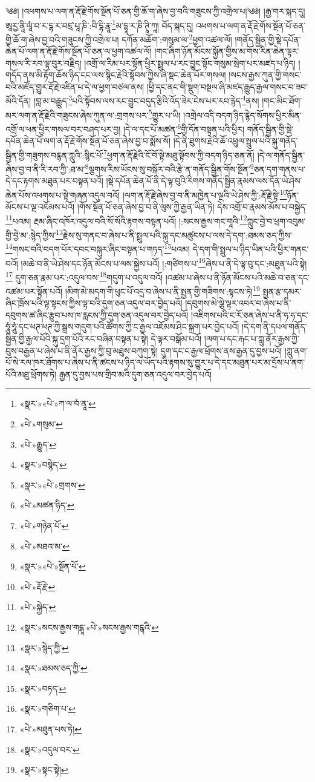 ༄༅། །འཕགས་པ་ལག་ན་རྡོ་རྗེ་གོས་སྔོན་པོ་ཅན་གྱི་ཆོ་ག་ཞེས་བྱ་བའི་གཟུངས་ཀྱི་འགྲེལ་པ།༄༅། །རྒྱ་གར་སྐད་དུ། ཨཱརྱ་ནཱི་ལཱཾ་བ་ར་དྷ་ར་བཛྲ་པཱ་ཎི་:བི་དྷི་རྣཱ་\footnote{«སྣར་»«པེ་»ཀ་ལ་བཾ་ནཱ་}མ་དྷཱ་ར་ཎི་ཊཱི་ཀཱ། བོད་སྐད་དུ། འཕགས་པ་ལག་ན་རྡོ་རྗེ་གོས་སྔོན་པོ་ཅན་གྱི་ཆོ་ག་ཞེས་བྱ་བའི་གཟུངས་ཀྱི་འགྲེལ་པ། དཀོན་མཆོག་:གསུམ་ལ་\footnote{«པེ་»གསུམ་}ཕྱག་འཚལ་ལོ། །གནོད་སྦྱིན་གྱི་སྡེ་དཔོན་ཆེན་པོ་ལག་ན་རྡོ་རྗེ་གོས་སྔོན་པོ་ཅན་ལ་ཕྱག་འཚལ་ལོ། །གང་ཞིག་ཉོན་མོངས་སྐྱོན་གྱིས་མ་གོས་རིན་ཆེན་ལྟར་གསལ་རི་རབ་ལྟ་བུར་བརྗིད། །འགྲོ་ལ་རིམ་པར་སྟོན་ཕྱིར་སྤྲུལ་པ་རང་བྱུང་སྟོང་གསུམ་སྲེག་པར་མཛད་པ་ཉིད། །གདོད་ནས་མི་རྟོག་ཆོས་ཉིད་ངང་ལས་སྙིང་རྗེའི་སྟོབས་ཀྱིས་ཞེ་སྡང་ཆེན་པོར་གསལ། །སངས་རྒྱས་ཀུན་གྱི་གསང་བའི་མཛོད་གྱུར་རྡོ་རྗེ་འཛིན་པ་དེ་ལ་ཕྱག་བཙལ་ནས། །ཕྱི་དང་ནང་གི་སྡུག་བསྔལ་ཞི་མཛད་རྒྱུད་རྒྱལ་གསང་བ་ཟབ་མོའི་དོན། །བླ་མ་བརྒྱུད་\footnote{«པེ་»རྒྱུད་}པའི་སྟོབས་ལས་རང་བྱུང་བདུད་རྩིའི་འོད་ཟེར་ངེས་པར་རབ་རྙེད་\footnote{«སྣར་»བསྙེད་}ནས། །གང་མིང་ཐོག་མར་ལག་ན་རྡོ་རྗེའི་གཟུངས་ཞེས་ཀུན་ལ་:གྲགས་པར་\footnote{«སྣར་»«པེ་»གྲགས་}གྱུར་པ་ཡི། །འགྲེལ་འདི་བདག་ཉིད་རྙེད་སོགས་ཕྱིར་མིན་འགྲོ་ལ་ཕན་ཕྱིར་གསལ་བར་བཤད་པར་བྱ། །དེ་ལ་དང་པོ་མཚན་\footnote{«པེ་»མཚན་ཉིད་}གྱི་དོན་བསྟན་པའི་ཕྱིར། གནོད་སྦྱིན་གྱི་སྡེ་དཔོན་ཆེན་པོ་ལག་ན་རྡོ་རྗེ་གོས་སྔོན་པོ་ཅན་ཞེས་བྱ་བ་སྨོས་སོ། །དེ་ནི་ཐུགས་རྗེའི་ཆོ་འཕྲུལ་སྤྲུལ་པའི་སྐུ་གནོད་སྦྱིན་གྱི་གཟུགས་བརྙན་ཀླུའི་:སྙིང་པོ་\footnote{«པེ་»གཉེན་པོ་}ཕྱག་ན་རྡོ་རྗེའི་ངོ་བོ་སྟེ་མཐུ་སྟོབས་ཀྱི་བདག་ཉིད་ཅན་ནོ། །དེ་ལ་གནོད་སྦྱིན་ཞེས་བྱ་བ་ནི་རི་རབ་ཀྱི་:ཐ་མ་\footnote{«པེ་»མཐའ་མ་}ལྕགས་རིས་ཡོངས་སུ་བསྐོར་བའི་རྩེ་ན་གནོད་སྦྱིན་གོས་སྔོན་\footnote{«སྣར་»«པེ་»སྔོན་པོ་}ཅན་དག་གནས་པ་དེ་དང་རྟགས་མཐུན་པར་བསྟན་པའོ། །སྡེ་དཔོན་ཆེན་པོ་ནི་དེ་ལྟ་བུའི་རིགས་གནོད་སྦྱིན་རྣམས་ལས་དོན་ཡེ་ཤེས་ཆེན་པོས་འཕགས་པ་སྟེ་གཞན་འདུལ་བའོ། །ལག་ན་རྡོ་རྗེ་ཞེས་བྱ་བ་ནི་མཁྱེན་པ་ལྔའི་ཡེ་ཤེས་ཀྱི་:རྡོ་རྗེ་སྟེ་\footnote{«པེ་»རྡོ་རྗེ་}ཉོན་མོངས་པ་ལྔ་འཇོམས་པའོ། །གོས་སྔོན་པོ་ཅན་ཞེས་བྱ་བ་ནི་ལུས་ཀྱི་རྒྱན་ཡིན་ཏེ། དེས་འགྲོ་བ་རྣམས་མོས་པ་བསྐྱེད་\footnote{«པེ་»སྐྱེད་}པའམ། རྔམ་ཞིང་འཁོར་འདུལ་བའི་སོ་སོའི་རྟགས་བསྟན་པའོ། །:སངས་རྒྱས་གང་གཱའི་\footnote{«སྣར་»སངས་རྒྱས་གངྒཱ་«པེ་»སངས་རྒྱས་གངྒའི་}ཀླུང་བྱེ་བ་ཕྲག་འབུམ་གྱི་བྱེ་མ་:སྙེད་ཀྱིས་\footnote{«སྣར་»སྙེད་ཀྱི་}རྗེས་སུ་གནང་བ་ཞེས་པ་ནི་སྤྲུལ་པའི་སྐུ་དང་མཚུངས་པ་ལས་དེ་དག་:ཐམས་ཅད་ཀྱིས་\footnote{«སྣར་»ཐམས་ཅད་ཀྱི་}གསང་བའི་བདག་པོར་དབང་བསྐུར་ཞིང་བསྟན་པ་གཏད་\footnote{«སྣར་»བཏད་}པའམ། དེ་དག་གི་སྤྲུལ་པ་ཉིད་ཡིན་པའི་ཕྱིར་གནང་བའོ། །མཆེ་བ་ནི་ཡེ་ཤེས་དང་ཉོན་མོངས་པ་ལས་སྐྱེས་པའོ། །:གཙིགས་པ་\footnote{«སྣར་»གཅིག་པ་}ཞེས་པ་ནི་དེ་ལྟ་བུ་དང་:མཐུན་པའི་སྟེ།\footnote{«པེ་»མཐུན་པས་ཏེ།} དུག་ཅན་རྣམ་པར་:འདུལ་བས་\footnote{«སྣར་»འདུལ་བར་}གདུག་པ་འདུལ་བའོ། །འཚམ་པ་ཞེས་པ་ནི་ཉོན་མོངས་པའི་མཆེ་བ་ཅན་དང་འཚམ་པར་སྟོན་པའོ། །མིག་མེ་མདག་གི་ཕུང་པོ་འདྲ་བ་ཞེས་པ་ནི་སྤྱན་གྱི་གཟིགས་:སྟངས་ཏེ།\footnote{«སྣར་»སྟང་སྟེ།} སྤྱན་རྩ་དམར་ཞིང་ཁྲོས་པའི་ལྟ་སྟངས་ཀྱིས་ལྟ་བའི་དུག་ཅན་འདུལ་བར་བྱེད་པའོ། །དབུགས་མེ་ལྕེ་ལྟར་འབར་བ་ཞེས་པ་ནི་དབུགས་ཚ་ཞིང་རྩུབ་པས་ཁ་རླངས་ཀྱི་དུག་ཅན་འདུལ་བར་བྱེད་པའོ། །འཇིགས་པའི་ང་རོ་ཅན་ཞེས་པ་ནི་ཧ་ཧ་དང་ཧཱུཾ་ཧཱུཾ་དང་ཕཊ་ཕཊ་ཀྱི་སྒྲས་གདུག་པའི་ཚོགས་ཀྱི་ང་རྒྱལ་འཇོམས་ཤིང་སྐྲག་པར་བྱེད་པའོ། །དེ་དག་ནི་དཔལ་གནོད་སྦྱིན་གྱི་རྒྱལ་པོའི་སྐུ་དྲག་པོའི་རང་བཞིན་བསྟན་པ་སྟེ། དེ་ལྟར་བསྒོམ་པའོ། །ལག་པ་དང་རྐང་པ་ཀླུ་ནོར་རྒྱས་ཀྱི་བུས་བརྒྱན་པ་ཞེས་པ་ནི་ནོར་རྒྱས་ཀྱི་བུ་མཐུས་བཀུག་སྟེ། དུག་དང་ང་རྒྱལ་ཕྲོགས་ནས་རྒྱན་དུ་བྱས་པའོ། །ཀླུ་ནག་པོ་སེ་རལ་ཁར་ཐོགས་པ་ཞེས་པ་ནི་ཚངས་པ་ཉིད་ལ་ཡོད་པའི་རྟགས་སུ་གྱུར་པ་དེ་དང་མཐུན་པར་མ་དྲོས་པ་ནག་པོའི་མཐུ་ཕྲོགས་ཏེ། རྒྱན་དུ་བྱས་པས་གྲིབ་མའི་དུག་ཅན་འདུལ་བར་བྱེད་པའོ། 